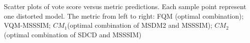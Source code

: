 Scatter plots of vote score versus metric predictions. Each sample point represent one distorted model. The metric from left to right: FQM \cite{Tian_2004}(optimal combination); VQM-MSSSIM; $CM_1$(optimal combination of MSDM2 and MSSSIM); $CM_2$(optimal combination of SDCD and MSSSIM)